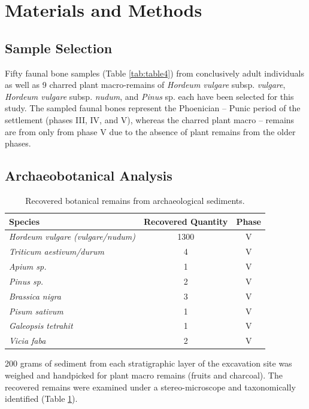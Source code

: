 \documentclass[5p]{elsarticle} %
\begin{document}
\hypertarget{materials-and-methods}{%
\section{Materials and Methods}\label{materials-and-methods}}

\hypertarget{sample-selection}{%
\subsection{Sample Selection}\label{sample-selection}}

Fifty faunal bone samples (Table \ref{tab:table4}) from conclusively adult individuals as well as 9 charred plant macro-remains of \emph{Hordeum vulgare} subsp. \emph{vulgare}, \emph{Hordeum vulgare} subsp. \emph{nudum}, and \emph{Pinus} sp. each have been selected for this study. The sampled faunal bones represent the Phoenician -- Punic period of the settlement (phases III, IV, and V), whereas the charred plant macro -- remains are from only from phase V due to the absence of plant remains from the older phases.

\hypertarget{archaeobotanical-analysis}{%
\subsection{Archaeobotanical Analysis}\label{archaeobotanical-analysis}}

\begin{table}[!h]

\caption{\label{tab:table2}Recovered botanical remains from archaeological sediments.}
\centering
\fontsize{7.5}{9.5}\selectfont
\begin{tabular}[t]{>{}lcc}
\toprule
Species & Recovered Quantity & Phase\\
\midrule
\em{Hordeum vulgare (vulgare/nudum)} & 1300 & V\\
\em{Triticum aestivum/durum} & 4 & V\\
\em{Apium sp.} & 1 & V\\
\em{Pinus sp.} & 2 & V\\
\em{Brassica nigra} & 3 & V\\
\em{Pisum sativum} & 1 & V\\
\em{Galeopsis tetrahit} & 1 & V\\
\em{Vicia faba} & 2 & V\\
\bottomrule
\end{tabular}
\end{table}

200 grams of sediment from each stratigraphic layer of the excavation site was weighed and handpicked for plant macro remains (fruits and charcoal). The recovered remains were examined under a stereo-microscope and taxonomically identified (Table \ref{tab:table2}).
\end{document}
